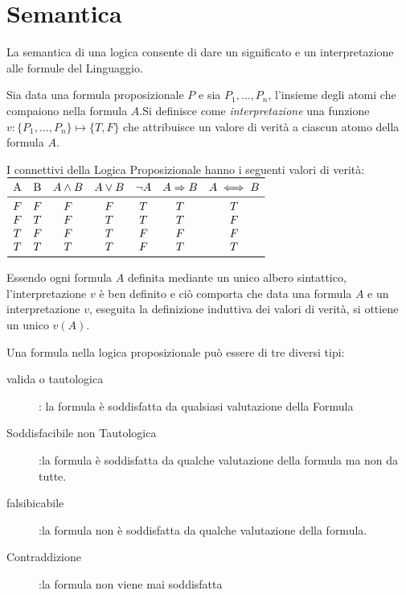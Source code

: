 \section{Semantica}
La semantica di una logica consente di dare un significato e un interpretazione
 alle formule del Linguaggio.\newline

\begin{defi}
Sia data una formula proposizionale $P$ e sia ${P_1,\dots,P_n}$, l'insieme degli
atomi che compaiono nella formula $A$.Si definisce come \emph{interpretazione} una
funzione $v:\{P_1,\dots,P_n\} \mapsto \{T,F\}$ che attribuisce un valore di verità
a ciascun atomo della formula $A$.
\end{defi}

I connettivi della Logica Proposizionale hanno i seguenti valori di verità:
$\begin{array}{ccccccc}
\toprule
\text{A} & \text{B} & A \land B & A \lor B & \neg A & A \Rightarrow B & A \iff B \\
\midrule
    F & F & F & F & T & T & T \\
    F & T & F & T & T & T & F \\
    T & F & F & T & F & F & F \\
    T & T & T & T & F & T & T \\
\bottomrule
\end{array}$\newline

Essendo ogni formula $A$ definita mediante un unico albero sintattico, l'interpretazione $v$
è ben definito e ciò comporta che data una formula $A$ e un interpretazione $v$,
eseguita la definizione induttiva dei valori di verità, si ottiene un unico $v(A)$.

Una formula nella logica proposizionale può essere di tre diversi tipi:
\begin{description}
    \item[valida o tautologica]: la formula è soddisfatta da qualsiasi valutazione della Formula
    \item[Soddisfacibile non Tautologica]:la formula è soddisfatta da qualche valutazione
                        della formula ma non da tutte.
    \item[falsibicabile]:la formula non è soddisfatta da qualche valutazione della formula.
    \item[Contraddizione]:la formula non viene mai soddisfatta
\end{description}


